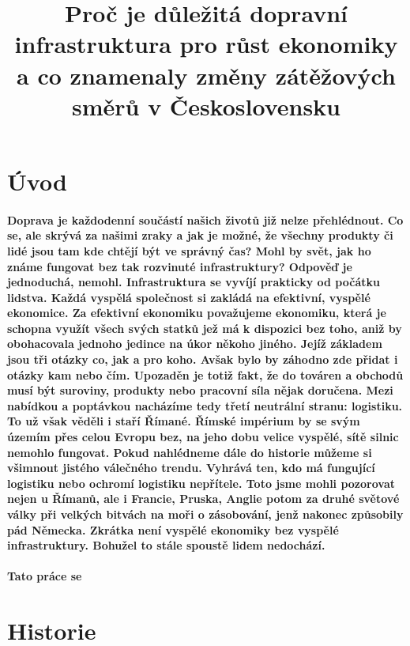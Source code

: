\documentclass{article}
\title{\vspace{-2cm}Proč je důležitá dopravní infrastruktura pro růst ekonomiky a co znamenaly změny zátěžových směrů v Československu\vspace{-1.7cm}}
\date{}
\author{}
\begin{document}
\maketitle
\tableofcontents
\newpage
\section{Úvod}

\paragraph{\quad Doprava je každodenní součástí našich životů již nelze přehlédnout. Co se, ale skrývá za našimi zraky a jak je možné, že všechny produkty či lidé jsou tam kde chtějí být ve správný čas? Mohl by svět, jak ho známe fungovat bez tak rozvinuté infrastruktury? Odpověď je jednoduchá, nemohl. Infrastruktura se vyvíjí prakticky od počátku lidstva. Každá vyspělá společnost si zakládá na efektivní, vyspělé ekonomice. Za efektivní ekonomiku považujeme ekonomiku, která je schopna využít všech svých statků jež má k dispozici bez toho, aniž by obohacovala jednoho jedince na úkor někoho jiného. Jejíž základem jsou tři otázky co, jak a pro koho. Avšak bylo by záhodno zde přidat i otázky kam nebo čím. Upozaděn je totiž fakt, že do továren a obchodů musí být suroviny, produkty nebo pracovní síla nějak doručena. Mezi nabídkou a poptávkou nacházíme tedy třetí neutrální stranu: logistiku. To už však věděli i staří Římané. Římské impérium by se svým územím přes celou Evropu bez, na jeho dobu velice vyspělé, sítě silnic nemohlo fungovat. Pokud nahlédneme dále do historie můžeme si všimnout jistého válečného trendu. Vyhrává ten, kdo má fungující logistiku nebo ochromí logistiku nepřítele. Toto jsme mohli pozorovat nejen u Římanů, ale i Francie, Pruska, Anglie potom za druhé světové války při velkých bitvách na moři o zásobování, jenž nakonec způsobily pád Německa. Zkrátka není vyspělé ekonomiky bez vyspělé infrastruktury. Bohužel to stále spoustě lidem nedochází.
 }
\paragraph{\quad Tato práce se }


\section{Historie}
\end{document}
